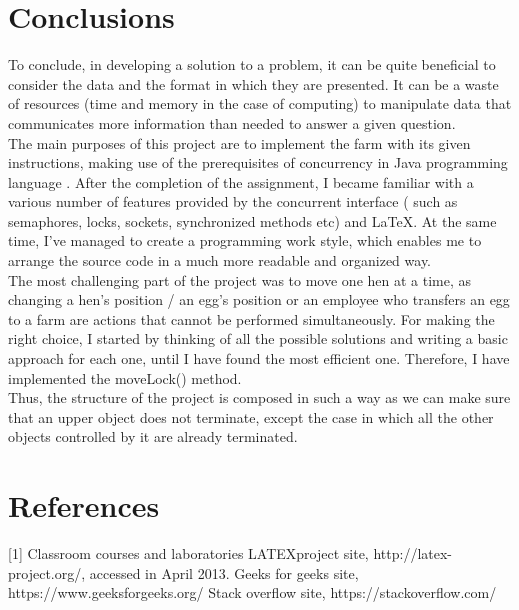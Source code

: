 \documentclass{article}
\begin{document}
\section{Conclusions}
To conclude, in developing a solution to a problem, it can be quite beneficial to consider the data and the format in which they are presented. It can be a waste of resources (time and memory in the case of computing) to manipulate data that communicates more information than needed to answer a given question. \\
The main purposes of this project are to implement the farm with its given instructions, making use of the prerequisites of  concurrency in Java programming language . After the completion of the assignment, I became familiar with a various  number of features provided by the concurrent interface ( such as semaphores, locks, sockets, synchronized methods etc) and LaTeX. At the same time, I've managed to create a programming work style, which enables me to arrange the source code in a much more readable and organized way.\\
The most challenging part of the project was to move one hen at a  time, as changing a hen's position / an egg's position or an employee who transfers an egg to a farm are actions that cannot be performed simultaneously. For making the right choice, I started by thinking of all the possible solutions and writing a basic approach for each one, until I have found the most efficient one. Therefore,  I have    implemented the moveLock() method. \\
Thus, the structure of the project is composed in such a way
as we can  make sure that an upper object does not terminate, except the case in which all the other objects controlled by it are already terminated. 
\section{References}
[1] Classroom courses and laboratories \newline \newline 
[2] LATEXproject site, http://latex-project.org/, accessed in April 2013. \newline  \newline 
[3] Geeks for geeks site, https://www.geeksforgeeks.org/ \newline \newline 
[4] Stack overflow site, https://stackoverflow.com/  
\end{document}
